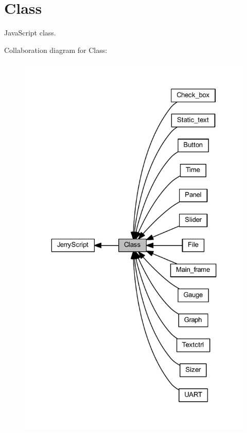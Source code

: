 \section{Class}
\label{group___class}


Java\+Script class.  


Collaboration diagram for Class\+:
\nopagebreak
\begin{figure}[H]
\begin{center}
\leavevmode
\includegraphics[width=323pt]{group___class}
\end{center}
\end{figure}
